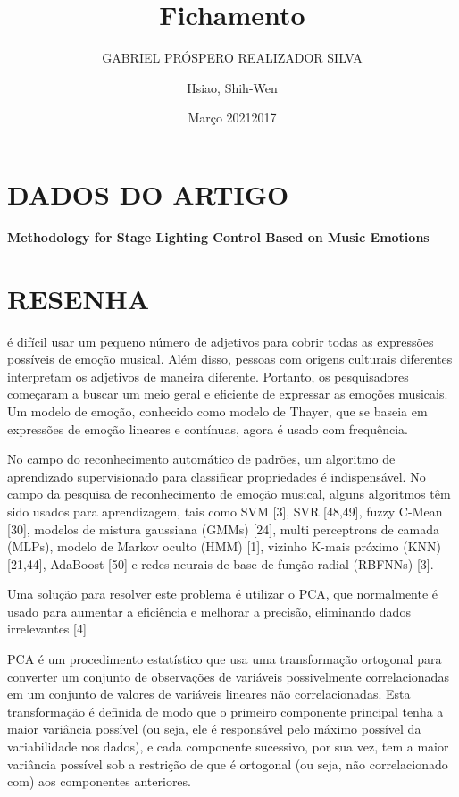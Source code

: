 \documentclass{article}
\title{Fichamento}
\author{GABRIEL PRÓSPERO REALIZADOR  SILVA}
\date{Março 2021}
\begin{document}
\maketitle

\section{DADOS DO ARTIGO}
\textbf{Methodology for Stage Lighting Control Based on Music Emotions \\}
\author{Hsiao, Shih-Wen \\}
\date{2017}

\section{RESENHA}
é difícil usar um pequeno número de adjetivos para cobrir todas as expressões possíveis de emoção musical. Além disso, pessoas com origens culturais diferentes interpretam os adjetivos de maneira diferente. Portanto, os pesquisadores começaram a buscar um meio geral e eficiente de expressar as emoções musicais. Um modelo de emoção, conhecido como modelo de Thayer, que se baseia em expressões de emoção lineares e contínuas, agora é usado com frequência.

No campo do reconhecimento automático de padrões, um algoritmo de aprendizado supervisionado para classificar propriedades é indispensável. No campo da pesquisa de reconhecimento de emoção musical, alguns algoritmos têm sido usados ​​para aprendizagem, tais como SVM [3], SVR [48,49], fuzzy C-Mean [30], modelos de mistura gaussiana (GMMs) [24], multi perceptrons de camada (MLPs), modelo de Markov oculto (HMM) [1], vizinho K-mais próximo (KNN) [21,44], AdaBoost [50] e redes neurais de base de função radial (RBFNNs) [3].

Uma solução para resolver este problema é utilizar o PCA, que normalmente é usado para aumentar a eficiência e melhorar a precisão, eliminando dados irrelevantes [4]

PCA é um procedimento estatístico que usa uma transformação ortogonal para converter um conjunto de observações de variáveis ​​possivelmente correlacionadas em um conjunto de valores de variáveis ​​lineares não correlacionadas.
Esta transformação é definida de modo que o primeiro componente principal tenha a maior variância possível (ou seja, ele é responsável pelo máximo possível da variabilidade nos dados), e cada componente sucessivo, por sua vez, tem a maior variância possível sob a restrição de que é ortogonal (ou seja, não correlacionado com) aos componentes anteriores.
\end{document}
